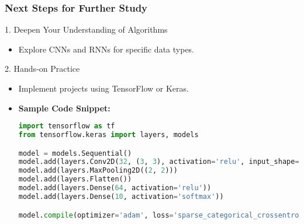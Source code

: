 \documentclass[aspectratio=169]{beamer}
\begin{document}
\begin{frame}[fragile]
  \frametitle{Next Steps for Further Study}

  \begin{block}{1. Deepen Your Understanding of Algorithms}
    \begin{itemize}
      \item Explore CNNs and RNNs for specific data types.
    \end{itemize}
  \end{block}

  \begin{block}{2. Hands-on Practice}
    \begin{itemize}
      \item Implement projects using TensorFlow or Keras.
      \item \textbf{Sample Code Snippet:}
      \begin{lstlisting}[language=Python]
import tensorflow as tf
from tensorflow.keras import layers, models

model = models.Sequential()
model.add(layers.Conv2D(32, (3, 3), activation='relu', input_shape=(64, 64, 3)))
model.add(layers.MaxPooling2D((2, 2)))
model.add(layers.Flatten())
model.add(layers.Dense(64, activation='relu'))
model.add(layers.Dense(10, activation='softmax'))

model.compile(optimizer='adam', loss='sparse_categorical_crossentropy', metrics=['accuracy'])
      \end{lstlisting}
    \end{itemize}
  \end{block}
\end{frame}
\end{document}
